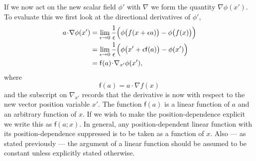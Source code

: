 \documentclass[a4paper]{article}
\numberwithin{equation}{section}
\newcommand{\nn}{\nonumber}
\newcommand{\dt}{\! \cdot \!}
\newcommand{\eqv}{=}
\newcommand{\eps}{\epsilon}
\newcommand{\lif}{\mathsf{f}}
\newcommand{\fu}{\lif}
\newcommand{\grad}{\nabla}
\begin{document}
If we now act on the new scalar field $\phi'$ with $\grad$ we form the
quantity $\grad\phi(x')$.  To evaluate this we first look at the
directional derivatives of $\phi'$,
%
\begin{align}
a \dt \grad \phi(x') &= \lim_{\eps \rightarrow 0} \frac{1}{\eps}
\Bigl( \phi \bigl(f(x + \eps a) \bigr) - \phi\bigl( f(x) \bigr) \Bigr) \nn \\
&=  \lim_{\eps \rightarrow 0} \frac{1}{\eps}
\Bigl( \phi \bigl(x' + \eps \fu(a)\bigr) - \phi(x') \Bigr) \nn \\
&= \fu(a) \dt \grad_{x'} \phi(x'),
\label{G1a}
\end{align}
%
where 
%
\begin{equation}
\fu(a) \eqv a \dt \grad f(x)
\end{equation} 
%
and the subscript on $\grad_{x'}$ records that the derivative is now
with respect to the new vector position variable $x'$.  The function
$\fu(a)$ is a linear function of $a$ and an arbitrary function of $x$.
If we wish to make the position-dependence explicit we write this as
$\fu(a;x)$.  In general, any position-dependent linear
function with its position-dependence suppressed is to be taken as a
function of $x$.  Also --- as stated previously --- the
argument of a linear function should be assumed to be constant unless
explicitly stated otherwise.
\end{document}
